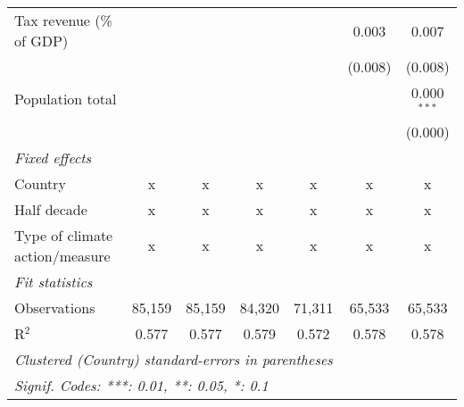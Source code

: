 \begin{tabular}{lcccccc}
   Tax revenue (\% of GDP)                       &         &               &               &               & 0.003         & 0.007\\   
                                                 &         &               &               &               & (0.008)       & (0.008)\\   
   Population total                              &         &               &               &               &               & 0.000$^{***}$\\   
                                                 &         &               &               &               &               & (0.000)\\   
   \emph{Fixed effects}\\
   Country                                       & x       & x             & x             & x             & x             & x\\  
   Half decade                                   & x       & x             & x             & x             & x             & x\\  
   Type of climate action/measure                & x       & x             & x             & x             & x             & x\\  
   \midrule \emph{Fit statistics}\\
   Observations                                  & 85,159  & 85,159        & 84,320        & 71,311        & 65,533        & 65,533\\  
   R$^2$                                         & 0.577   & 0.577         & 0.579         & 0.572         & 0.578         & 0.578\\  
   \midrule
   \multicolumn{7}{l}{\emph{Clustered (Country) standard-errors in parentheses}}\\
   \multicolumn{7}{l}{\emph{Signif. Codes: ***: 0.01, **: 0.05, *: 0.1}}\\
\end{tabular}
\par\endgroup


